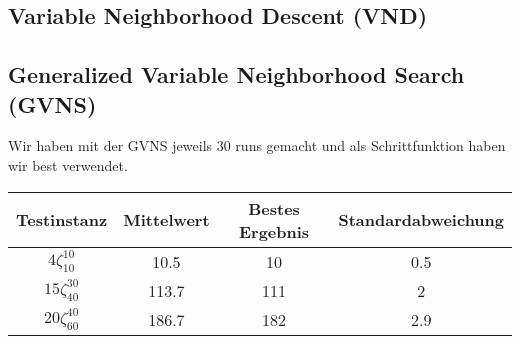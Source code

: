 \documentclass[a4paper,10pt]{article}
\begin{document}
\subsection{Variable Neighborhood Descent (VND)}

\subsection{Generalized Variable Neighborhood Search (GVNS)}

Wir haben mit der GVNS jeweils 30 runs gemacht und als Schrittfunktion haben wir best verwendet.

\begin{tabular}{cccc}
\hline
Testinstanz & Mittelwert & Bestes Ergebnis & Standardabweichung \\
\hline
$4\zeta_{10}^{10}$ & 10.5 & 10 & 0.5 \\									
$15\zeta_{40}^{30}$ & 113.7 & 111 & 2 \\									
$20\zeta_{60}^{40}$ & 186.7 & 182 & 2.9 \\						
\hline
\end{tabular}
\end{document}
